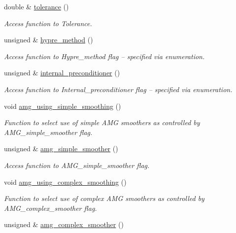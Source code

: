 \begin{DoxyCompactItemize}
double \& \hyperlink{classoomph_1_1HypreSolver_a54945bba18bf066450b85ba21145656a}{tolerance} ()
\begin{DoxyCompactList}\small\item\em Access function to Tolerance. \end{DoxyCompactList}\item 
unsigned \& \hyperlink{classoomph_1_1HypreSolver_a2e6f6cbb98d3bdf91ae657eb2a0a87d9}{hypre\+\_\+method} ()
\begin{DoxyCompactList}\small\item\em Access function to Hypre\+\_\+method flag -- specified via enumeration. \end{DoxyCompactList}\item 
unsigned \& \hyperlink{classoomph_1_1HypreSolver_acd4ce0f300c01fe2d9f802e5c0c0876b}{internal\+\_\+preconditioner} ()
\begin{DoxyCompactList}\small\item\em Access function to Internal\+\_\+preconditioner flag -- specified via enumeration. \end{DoxyCompactList}\item 
void \hyperlink{classoomph_1_1HypreSolver_a87dd154df66240c7cb3ef08610ab72f8}{amg\+\_\+using\+\_\+simple\+\_\+smoothing} ()
\begin{DoxyCompactList}\small\item\em Function to select use of \textquotesingle{}simple\textquotesingle{} A\+MG smoothers as controlled by A\+M\+G\+\_\+simple\+\_\+smoother flag. \end{DoxyCompactList}\item 
unsigned \& \hyperlink{classoomph_1_1HypreSolver_a03802971bc875e562bf91c779188e210}{amg\+\_\+simple\+\_\+smoother} ()
\begin{DoxyCompactList}\small\item\em Access function to A\+M\+G\+\_\+simple\+\_\+smoother flag. \end{DoxyCompactList}\item 
void \hyperlink{classoomph_1_1HypreSolver_a7bef620aeade1b657f5051c93bf7e437}{amg\+\_\+using\+\_\+complex\+\_\+smoothing} ()
\begin{DoxyCompactList}\small\item\em Function to select use of \textquotesingle{}complex\textquotesingle{} A\+MG smoothers as controlled by A\+M\+G\+\_\+complex\+\_\+smoother flag. \end{DoxyCompactList}\item 
unsigned \& \hyperlink{classoomph_1_1HypreSolver_a71d527f704e0fffaa736f40a483e78e4}{amg\+\_\+complex\+\_\+smoother} ()

\end{DoxyCompactItemize}
